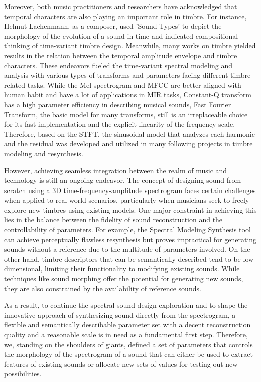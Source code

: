 \documentclass{article}
\begin{document}
Moreover, both music practitioners and researchers have acknowledged that temporal characters are also playing an important role in timbre. For instance, Helmut Lachenmann, as a composer, used 'Sound Types' to depict the morphology of the evolution of a sound in time and indicated compositional thinking of time-variant timbre design\cite{tsao:2014}. Meanwhile, many works on timbre yielded results in the relation between the temporal amplitude envelope and timbre characters\cite{mcadams:1995}\cite{Caclin:2005}. These endeavors fueled the time-variant spectral modeling and analysis with various types of transforms and parameters facing different timbre-related tasks. While the Mel-spectrogram and MFCC are better aligned with human habit and have a lot of applications in MIR tasks\cite{logan2000mel}\cite{nagawade2017musical}\cite{muller2007information}, Constant-Q transform has a high parameter efficiency in describing musical sounds\cite{brown1991calculation}\cite{brown1992efficient}, Fast Fourier Transform, the basic model for many transforms, still is an irreplaceable choice for its fast implementation and the explicit linearity of the frequency scale. Therefore, based on the STFT, the sinusoidal model that analyzes each harmonic and the residual was developed and utilized in many following projects in timbre modeling and resynthesis\cite{juliussmith1990}\cite{george1992analysis}\cite{engel2020ddsp}.


However, achieving seamless integration between the realm of music and technology is still an ongoing endeavor. The concept of designing sound from scratch using a 3D time-frequency-amplitude spectrogram faces certain challenges when applied to real-world scenarios, particularly when musicians seek to freely explore new timbres using existing models. One major constraint in achieving this lies in the balance between the fidelity of sound reconstruction and the controllability of parameters. For example, the Spectral Modeling Synthesis tool\cite{juliussmith1990} can achieve perceptually flawless resynthesis but proves impractical for generating sounds without a reference due to the multitude of parameters involved. On the other hand, timbre descriptors that can be semantically described tend to be low-dimensional, limiting their functionality to modifying existing sounds. While techniques like sound morphing\cite{caetano2011morph} offer the potential for generating new sounds, they are also constrained by the availability of reference sounds.

As a result, to continue the spectral sound design exploration and to shape the innovative approach of synthesizing sound directly from the spectrogram, a flexible and semantically describable parameter set with a decent reconstruction quality and a reasonable scale is in need as a fundamental first step. Therefore, we, standing on the shoulders of giants, defined a set of parameters that controls the morphology of the spectrogram of a sound that can either be used to extract features of existing sounds or allocate new sets of values for testing out new possibilities. 
\end{document}

